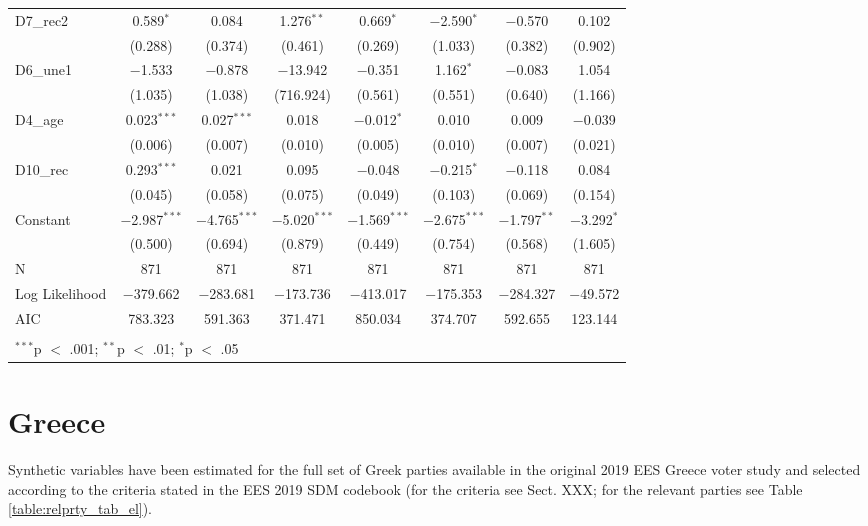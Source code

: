 \documentclass[
]{article}
\begin{document}
\begin{table}[!htbp]
\begin{tabular}{@{\extracolsep{5pt}}lccccccc}
  D7\_rec2 & 0.589$^{*}$ & 0.084 & 1.276$^{**}$ & 0.669$^{*}$ & $-$2.590$^{*}$ & $-$0.570 & 0.102 \\ 
  & (0.288) & (0.374) & (0.461) & (0.269) & (1.033) & (0.382) & (0.902) \\ 
  D6\_une1 & $-$1.533 & $-$0.878 & $-$13.942 & $-$0.351 & 1.162$^{*}$ & $-$0.083 & 1.054 \\ 
  & (1.035) & (1.038) & (716.924) & (0.561) & (0.551) & (0.640) & (1.166) \\ 
  D4\_age & 0.023$^{***}$ & 0.027$^{***}$ & 0.018 & $-$0.012$^{*}$ & 0.010 & 0.009 & $-$0.039 \\ 
  & (0.006) & (0.007) & (0.010) & (0.005) & (0.010) & (0.007) & (0.021) \\ 
  D10\_rec & 0.293$^{***}$ & 0.021 & 0.095 & $-$0.048 & $-$0.215$^{*}$ & $-$0.118 & 0.084 \\ 
  & (0.045) & (0.058) & (0.075) & (0.049) & (0.103) & (0.069) & (0.154) \\ 
  Constant & $-$2.987$^{***}$ & $-$4.765$^{***}$ & $-$5.020$^{***}$ & $-$1.569$^{***}$ & $-$2.675$^{***}$ & $-$1.797$^{**}$ & $-$3.292$^{*}$ \\ 
  & (0.500) & (0.694) & (0.879) & (0.449) & (0.754) & (0.568) & (1.605) \\ 
 N & 871 & 871 & 871 & 871 & 871 & 871 & 871 \\ 
Log Likelihood & $-$379.662 & $-$283.681 & $-$173.736 & $-$413.017 & $-$175.353 & $-$284.327 & $-$49.572 \\ 
AIC & 783.323 & 591.363 & 371.471 & 850.034 & 374.707 & 592.655 & 123.144 \\ 
\hline \\[-1.8ex] 
\multicolumn{8}{l}{$^{***}$p $<$ .001; $^{**}$p $<$ .01; $^{*}$p $<$ .05} \\ 
\end{tabular} 
\end{table}

\clearpage

\newpage

\hypertarget{greece}{%
\section{Greece}\label{greece}}

Synthetic variables have been estimated for the full set of Greek parties available in the original
2019 EES Greece voter study and selected according to the criteria stated in the EES 2019 SDM codebook (for the criteria see Sect. XXX; for the relevant parties see Table \ref{table:relprty_tab_el}).
\end{document}
